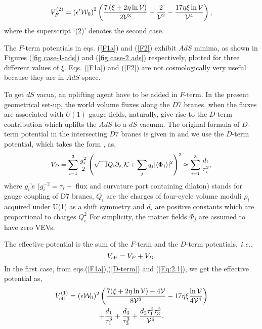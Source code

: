 \documentclass[doublecol]{epl2}
\begin{document}
\begin{equation}\small
V_F^{(2)}=\left(\epsilon'\mathcal{W}_0\right)^2\left(\frac{7\left(\xi+2\eta\ln\mathcal{V}\right)}{2\mathcal{V}^3}-\frac{2}{\mathcal{V}^2}-\frac{17\eta\xi\ln\mathcal{V}}{\mathcal{V}^4}\right),
    \label{F2}
\end{equation} where the superscript `(2)' denotes the second case.\par 
The $F$-term potentials in eqs. (\ref{F1a}) and (\ref{F2}) exhibit $AdS$ minima, as shown in Figures (\ref{fig case-1-ads}) and (\ref{fig case-2 ads}) respectively, plotted for three different values of $\xi$. Eqs. (\ref{F1a}) and (\ref{F2}) are not cosmologically very useful because they are in $AdS$ space. \par
  To get $dS$ vacua, an uplifting agent \cite{Kachru:2003aw,Balasubramanian:2005zx,AbdusSalam:2020ywo} have to be added in $F$-term. In the present geometrical set-up, the world volume fluxes along the $D7$ branes, when the fluxes are associated with $U(1)$ gauge fields, naturally, give rise to the $D$-term contribution \cite{Burgess:2003ic,Basiouris:2021sdf,Antoniadis:2018hqy} which uplifts the $AdS$ to a $dS$ vacuum. The original formula of $D$-term potential in the intersecting $D7$ branes is given in \cite{Antoniadis:2018hqy,Cremades:2007ig,Haack:2006cy,Burgess:2003ic} and we use the $D$-term potential, which takes the form \cite{Antoniadis:2018hqy,Basiouris:2020jgp}, as,
\begin{equation}\small
\begin{split}
    V_D=\sum_{i=1}^3\frac{g_{i}^2}{2}\left(\sqrt{-1}Q_i\partial_{\rho_i}\mathcal{K}+\sum_{j}q_j|\langle\Phi_j\rangle|^2\right)^2 \approx \sum_{i=1}^3 \frac{d_i}{\tau_i^3},
    \label{D-term}
    \end{split}
\end{equation}
where $g_i$'s ($g_i^{-2}= \tau_i +$ flux and curvature part containing dilaton) stands for gauge coupling of D7 branes, $Q_i$ are the charges of four-cycle volume moduli $\rho_i$ acquired under U(1) as a shift symmetry and $d_i$ are positive constants which are proportional to charges $Q_i^2$  For simplicity, the matter fields $\Phi_j$ are assumed to have zero VEVs\cite{Let:2022fmu, Basiouris:2021sdf}.\par 
The effective potential is the sum of the $F$-term and the $D$-term potentials, $\it{i.e.}$,
\begin{equation}\small
     V_{\mathrm{eff}}=V_F + V_D.
\end{equation}
In the first case, from eqs.(\ref{F1a}),(\ref{D-term}) and (\ref{Eq:2.1}), we get the effective potential as,
\begin{multline}\small
   V_{\mathrm{eff}}^{(1)}=(\epsilon\mathcal{W}_0)^2\left(\frac{7(\xi+2\eta\ln\mathcal{V})-4\mathcal{V}}{8\mathcal{V}^3}-17\eta\xi\frac{\ln\mathcal{V}}{4\mathcal{V}^4}\right)\\+ \frac{d_1}{\tau_1^3}+\frac{d_3}{\tau_3^3}+\frac{d_2\tau_1^3\tau_3^3}{\mathcal{V}^6}.
   \label{V-effb1}
\end{multline}
\end{document}
